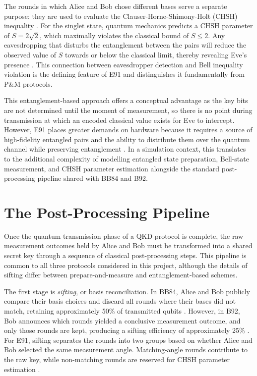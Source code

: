 \documentclass[10pt, a4paper]{report}
\begin{document}
The rounds in which Alice and Bob chose different bases serve a separate purpose: they are used to evaluate the Clauser-Horne-Shimony-Holt (CHSH) inequality \cite{QKDbible}. For the singlet state, quantum mechanics predicts a CHSH parameter of $S = 2\sqrt{2}$, which maximally violates the classical bound of $S \leq 2$. Any eavesdropping that disturbs the entanglement between the pairs will reduce the observed value of $S$ towards or below the classical limit, thereby revealing Eve's presence \cite{ekertQI, E91}. This connection between eavesdropper detection and Bell inequality violation is the defining feature of E91 and distinguishes it fundamentally from P\&M protocols.

This entanglement-based approach offers a conceptual advantage as the key bits are not determined until the moment of measurement, so there is no point during transmission at which an encoded classical value exists for Eve to intercept. However, E91 places greater demands on hardware because it requires a source of high-fidelity entangled pairs and the ability to distribute them over the quantum channel while preserving entanglement \cite{ekertQI}. In a simulation context, this translates to the additional complexity of modelling entangled state preparation, Bell-state measurement, and CHSH parameter estimation alongside the standard post-processing pipeline shared with BB84 and B92.



\section{The Post-Processing Pipeline}
Once the quantum transmission phase of a QKD protocol is complete, the raw measurement outcomes held by Alice and Bob must be transformed into a shared secret key through a sequence of classical post-processing steps. This pipeline is common to all three protocols considered in this project, although the details of sifting differ between prepare-and-measure and entanglement-based schemes.

The first stage is \textit{sifting}, or basis reconciliation. In BB84, Alice and Bob publicly compare their basis choices and discard all rounds where their bases did not match, retaining approximately 50\% of transmitted qubits \cite{BB84}. However, in B92, Bob announces which rounds yielded a conclusive measurement outcome, and only those rounds are kept, producing a sifting efficiency of approximately 25\% \cite{B92}. For E91, sifting separates the rounds into two groups based on whether Alice and Bob selected the same measurement angle. Matching-angle rounds contribute to the raw key, while non-matching rounds are reserved for CHSH parameter estimation \cite{E91}.
\end{document}
